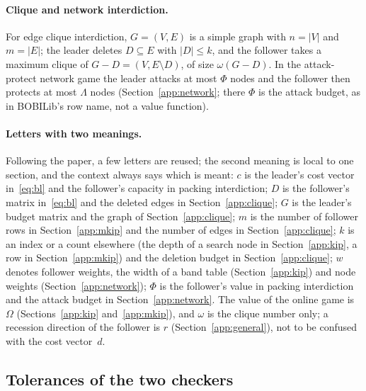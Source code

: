 \paragraph{Clique and network interdiction.}
For edge clique interdiction, $G=(V,E)$ is a simple graph with $n=|V|$ and
$m=|E|$; the leader deletes $D\subseteq E$ with $|D|\le k$, and the follower
takes a maximum clique of $G-D=(V,E\setminus D)$, of size $\omega(G-D)$. In the
attack-protect network game the leader attacks at most $\Phi$ nodes and the
follower then protects at most $\Lambda$ nodes (Section~\ref{app:network}; there
$\Phi$ is the attack budget, as in BOBILib's row name, not a value function).

\paragraph{Letters with two meanings.} Following the paper, a few letters
are reused; the second meaning is local to one section, and the context
always says which is meant: $c$ is the leader's cost vector
in~\eqref{eq:bl} and the follower's capacity in packing interdiction; $D$ is
the follower's matrix in~\eqref{eq:bl} and the deleted edges in
Section~\ref{app:clique}; $G$ is the leader's budget matrix and the graph of
Section~\ref{app:clique}; $m$ is the number of follower rows in
Section~\ref{app:mkip} and the number of edges in Section~\ref{app:clique};
$k$ is an index or a count elsewhere (the depth of a search node in
Section~\ref{app:kip}, a row in Section~\ref{app:mkip}) and the deletion
budget in Section~\ref{app:clique}; $w$ denotes follower weights, the width of a
band table (Section~\ref{app:kip}) and node weights
(Section~\ref{app:network}); $\Phi$ is the follower's value in packing
interdiction and the attack budget in Section~\ref{app:network}. The value of
the online game is $\Omega$ (Sections~\ref{app:kip} and~\ref{app:mkip}), and
$\omega$ is the clique number only; a recession direction of the follower is
$r$ (Section~\ref{app:general}), not to be confused with the cost vector~$d$.

\subsection{Tolerances of the two checkers}\label{app:tolerances}

